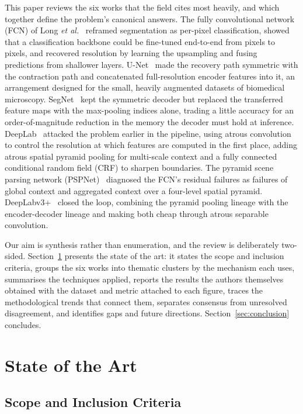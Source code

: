 \documentclass[journal]{IEEEtran}
\begin{document}
This paper reviews the six works that the field cites most heavily, and which
together define the problem's canonical answers. The fully convolutional network
(FCN) of Long \emph{et al.}~\cite{long2014fully} reframed segmentation as per-pixel
classification, showed that a classification backbone could be fine-tuned end-to-end
from pixels to pixels, and recovered resolution by learning the upsampling and fusing
predictions from shallower layers. U-Net~\cite{ronneberger2015unet} made the
recovery path symmetric with the contraction path and concatenated full-resolution
encoder features into it, an arrangement designed for the small, heavily augmented
datasets of biomedical microscopy. SegNet~\cite{badrinarayanan2015segnet} kept the
symmetric decoder but replaced the transferred feature maps with the max-pooling
indices alone, trading a little accuracy for an order-of-magnitude reduction in the
memory the decoder must hold at inference. DeepLab~\cite{chen2016deeplab} attacked
the problem earlier in the pipeline, using atrous convolution to control the
resolution at which features are computed in the first place, adding atrous spatial
pyramid pooling for multi-scale context and a fully connected conditional random
field (CRF) to sharpen boundaries. The pyramid scene parsing network
(PSPNet)~\cite{zhao2016pspnet} diagnosed the FCN's residual failures as failures of
global context and aggregated context over a four-level spatial pyramid.
DeepLabv3+~\cite{chen2018encoderdecoder} closed the loop, combining the pyramid
pooling lineage with the encoder-decoder lineage and making both cheap through atrous
separable convolution.

Our aim is synthesis rather than enumeration, and the review is deliberately
two-sided. Section~\ref{sec:sota} presents the state of the art: it states the scope
and inclusion criteria, groups the six works into thematic clusters by the mechanism
each uses, summarises the techniques applied, reports the results the authors
themselves obtained with the dataset and metric attached to each figure, traces the
methodological trends that connect them, separates consensus from unresolved
disagreement, and identifies gaps and future directions.
Section~\ref{sec:conclusion} concludes.

\section{State of the Art}
\label{sec:sota}

\subsection{Scope and Inclusion Criteria}
\end{document}

